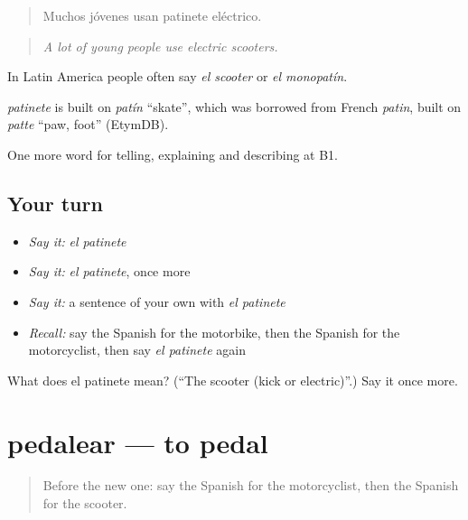 \begin{quote}
Muchos jóvenes usan patinete eléctrico.
\end{quote}

\begin{quote}
\emph{A lot of young people use electric scooters.}
\end{quote}

In Latin America people often say \emph{el scooter} or \emph{el monopatín}.

\begin{cousinweb}
\emph{patinete} is built on \emph{patín} \textquotedblleft{}skate\textquotedblright{}, which was borrowed from French \emph{patin}, built on \emph{patte} \textquotedblleft{}paw, foot\textquotedblright{} (EtymDB).
\end{cousinweb}

\begin{grammarlens}[title={What you've built}]
One more word for telling, explaining and describing at B1.
\end{grammarlens}

\subsection*{Your turn}
\begin{itemize}
\raggedright
  \item \emph{Say it:} \emph{el patinete}
  \item \emph{Say it:} \emph{el patinete}, once more
  \item \emph{Say it:} a sentence of your own with \emph{el patinete}
  \item \emph{Recall:} say the Spanish for the motorbike, then the Spanish for the motorcyclist, then say \emph{el patinete} again
\end{itemize}

\begin{tcolorbox}[breakable,colback=teal!4,colframe=teal!35!black,title={Before you move on}]
What does el patinete mean? (\textquotedblleft{}The scooter (kick or electric)\textquotedblright{}.) Say it once more.
\end{tcolorbox}
\section[pedalear]{pedalear — to pedal}

\label{lesson:ES-C649-pedalear}



\begin{quote}
Before the new one: say the Spanish for the motorcyclist, then the Spanish for the scooter.
\end{quote}

